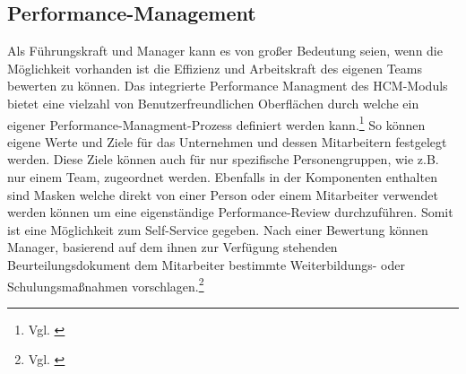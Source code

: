 \subsection{Performance-Management}
Als Führungskraft und Manager kann es von großer Bedeutung seien, wenn die Möglichkeit vorhanden ist die Effizienz und Arbeitskraft des eigenen Teams bewerten zu können. Das integrierte Performance Managment des HCM-Moduls bietet eine vielzahl von Benutzerfreundlichen Oberflächen durch welche ein eigener Performance-Managment-Prozess definiert werden kann.\footnote{Vgl. \cite{SAPSE2024d}} So können eigene Werte und Ziele für das Unternehmen und dessen Mitarbeitern festgelegt werden. Diese Ziele können auch für nur spezifische Personengruppen, wie z.B. nur einem Team, zugeordnet werden. Ebenfalls in der Komponenten enthalten sind Masken welche direkt von einer Person oder einem Mitarbeiter verwendet werden können um eine eigenständige Performance-Review durchzuführen. Somit ist eine Möglichkeit zum Self-Service gegeben. Nach einer Bewertung können Manager, basierend auf dem ihnen zur Verfügung stehenden Beurteilungsdokument dem Mitarbeiter bestimmte Weiterbildungs- oder Schulungsmaßnahmen vorschlagen.\footnote{Vgl. \cite{SAPSE2024d}} 
